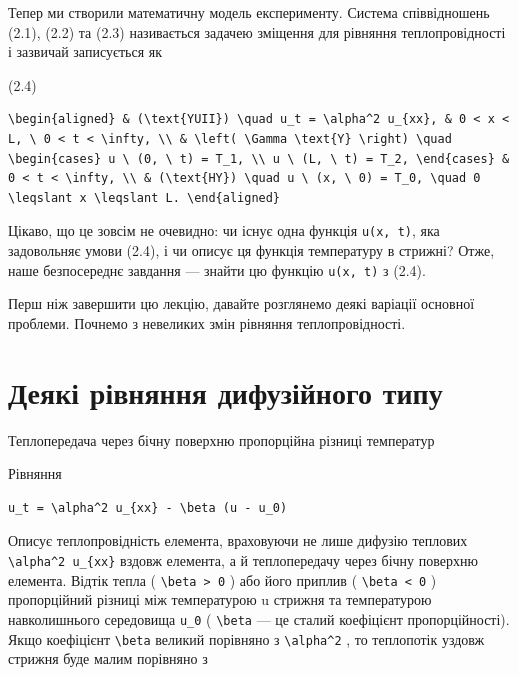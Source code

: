 \documentclass[
  ukrainian,
]{article}
\begin{document}
Тепер ми створили математичну модель експерименту. Система співвідношень
(2.1), (2.2) та (2.3) називається задачею зміщення для рівняння
теплопровідності і зазвичай записується як

(2.4)

\begin{verbatim}
\begin{aligned} & (\text{YUII}) \quad u_t = \alpha^2 u_{xx}, & 0 < x < L, \ 0 < t < \infty, \\ & \left( \Gamma \text{Y} \right) \quad \begin{cases} u \ (0, \ t) = T_1, \\ u \ (L, \ t) = T_2, \end{cases} & 0 < t < \infty, \\ & (\text{HY}) \quad u \ (x, \ 0) = T_0, \quad 0 \leqslant x \leqslant L. \end{aligned}
\end{verbatim}

Цікаво, що це зовсім не очевидно: чи існує одна функція
\texttt{u(x,\ t)}, яка задовольняє умови (2.4), і чи описує ця функція
температуру в стрижні? Отже, наше безпосереднє завдання --- знайти цю
функцію \texttt{u(x,\ t)} з (2.4).

Перш ніж завершити цю лекцію, давайте розглянемо деякі варіації основної
проблеми. Почнемо з невеликих змін рівняння теплопровідності.

\section{Деякі рівняння дифузійного
типу}\label{ux434ux435ux44fux43aux456-ux440ux456ux432ux43dux44fux43dux43dux44f-ux434ux438ux444ux443ux437ux456ux439ux43dux43eux433ux43e-ux442ux438ux43fux443}

Теплопередача через бічну поверхню пропорційна різниці температур

Рівняння

\begin{verbatim}
u_t = \alpha^2 u_{xx} - \beta (u - u_0)
\end{verbatim}

Описує теплопровідність елемента, враховуючи не лише дифузію теплових
\texttt{\textbackslash{}alpha\^{}2\ u\_\{xx\}} вздовж елемента, а й
теплопередачу через бічну поверхню елемента. Відтік тепла (
\texttt{\textbackslash{}beta\ \textgreater{}\ 0} ) або його приплив (
\texttt{\textbackslash{}beta\ \textless{}\ 0} ) пропорційний різниці між
температурою u стрижня та температурою навколишнього середовища
\texttt{u\_0} ( \texttt{\textbackslash{}beta} --- це сталий коефіцієнт
пропорційності). Якщо коефіцієнт \texttt{\textbackslash{}beta} великий
порівняно з \texttt{\textbackslash{}alpha\^{}2} , то теплопотік уздовж
стрижня буде малим порівняно з
\end{document}
